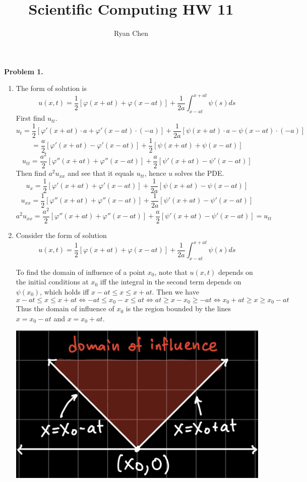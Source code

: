 \documentclass{article}
\title{Scientific Computing HW 11}
\author{Ryan Chen}
\def\tbf#1{\textbf{#1}}
\newcommand{\vp}{\varphi}
\begin{document}
	
\maketitle



\tbf{Problem 1.}

\begin{enumerate}[label=(\alph*)]
	
\item The form of solution is
$$u(x,t) = \frac12[\vp(x+at)+\vp(x-at)] + \frac{1}{2a}\int_{x-at}^{x+at}\psi(s)ds$$
First find $u_{tt}$.
$$u_t = \frac12[\vp'(x+at)\cdot a+\vp'(x-at)\cdot(-a)] + \frac{1}{2a}[\psi(x+at)\cdot a-\psi(x-at)\cdot(-a)]$$
$$= \frac{a}{2}[\vp'(x+at)-\vp'(x-at)] + \frac12[\psi(x+at)+\psi(x-at)]$$
$$u_{tt} = \frac{a^2}{2}[\vp''(x+at)+\vp''(x-at)] + \frac a2[\psi'(x+at)-\psi'(x-at)]$$
Then find $a^2u_{xx}$ and see that it equals $u_{tt}$, hence $u$ solves the PDE.
$$u_x = \frac12[\vp'(x+at)+\vp'(x-at)] + \frac{1}{2a}[\psi(x+at)-\psi(x-at)]$$
$$u_{xx} = \frac12[\vp''(x+at)+\vp''(x-at)] + \frac{1}{2a}[\psi'(x+at)-\psi'(x-at)]$$
$$a^2u_{xx} = \frac{a^2}{2}[\vp''(x+at)+\vp''(x-at)] + \frac{a}{2}[\psi'(x+at)-\psi'(x-at)] = u_{tt}$$


\item Consider the form of solution
$$u(x,t) = \frac12[\vp(x+at)+\vp(x-at)] + \frac{1}{2a}\int_{x-at}^{x+at}\psi(s)ds$$

To find the domain of influence of a point $x_0$, note that $u(x,t)$ depends on the initial conditions at $x_0$ iff the integral in the second term depends on $\psi(x_0)$, which holds iff $x-at\le x\le x+at$. Then we have
$$x-at \le x \le x+at
\iff -at \le x_0-x \le at
\iff at \ge x-x_0 \ge -at
\iff x_0+at \ge x \ge x_0-at$$
Thus the domain of influence of $x_0$ is the region bounded by the lines $x=x_0-at$ and $x=x_0+at$.

\begin{center}
	\includegraphics[scale=.1]{hw11 doi}
\end{center}


\end{enumerate}
\end{document}
